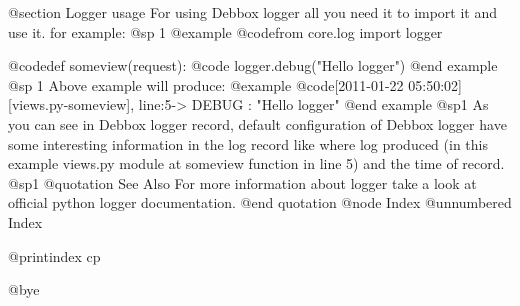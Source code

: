 @section Logger usage
For using Debbox logger all you need it to import it and use it. for example:
@sp 1
@example
@code{from core.log import logger}


@code{def someview(request):}
@code{    logger.debug("Hello logger")}
@end example
@sp 1
Above example will produce:
@example
@code{[2011-01-22 05:50:02] [views.py-someview], line:5-> DEBUG     : "Hello logger"}
@end example
@sp1
As you can see in Debbox logger record, default configuration of Debbox logger have some interesting information in the log record like where log produced (in this example views.py module at someview function in line 5) and the time of record.
@sp1
@quotation See Also
For more information about logger take a look at official python logger documentation.
@end quotation
@node Index
@unnumbered Index

@printindex cp

@bye
